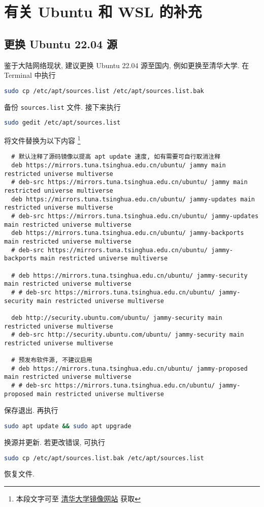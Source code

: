 
\chapter{有关 Ubuntu 和 WSL 的补充}\label{chp:appendix:addition}

\section{更换 Ubuntu 22.04 源}\label{sec:addition:source}

鉴于大陆网络现状,
建议更换 Ubuntu 22.04 源至国内,
例如更换至清华大学.
在 \textsf{Terminal} 中执行
\begin{lstlisting}[language = bash]
  sudo cp /etc/apt/sources.list /etc/apt/sources.list.bak
\end{lstlisting}
备份 \texttt{sources.list} 文件.
接下来执行
\begin{lstlisting}[language = bash]
  sudo gedit /etc/apt/sources.list
\end{lstlisting}
将文件替换为以下内容%
\footnote{本段文字可至%
  \href{https://mirrors.tuna.tsinghua.edu.cn/help/ubuntu/}{清华大学镜像网站}%
  获取}
\begin{lstlisting}
  # 默认注释了源码镜像以提高 apt update 速度, 如有需要可自行取消注释
  deb https://mirrors.tuna.tsinghua.edu.cn/ubuntu/ jammy main restricted universe multiverse
  # deb-src https://mirrors.tuna.tsinghua.edu.cn/ubuntu/ jammy main restricted universe multiverse
  deb https://mirrors.tuna.tsinghua.edu.cn/ubuntu/ jammy-updates main restricted universe multiverse
  # deb-src https://mirrors.tuna.tsinghua.edu.cn/ubuntu/ jammy-updates main restricted universe multiverse
  deb https://mirrors.tuna.tsinghua.edu.cn/ubuntu/ jammy-backports main restricted universe multiverse
  # deb-src https://mirrors.tuna.tsinghua.edu.cn/ubuntu/ jammy-backports main restricted universe multiverse

  # deb https://mirrors.tuna.tsinghua.edu.cn/ubuntu/ jammy-security main restricted universe multiverse
  # # deb-src https://mirrors.tuna.tsinghua.edu.cn/ubuntu/ jammy-security main restricted universe multiverse

  deb http://security.ubuntu.com/ubuntu/ jammy-security main restricted universe multiverse
  # deb-src http://security.ubuntu.com/ubuntu/ jammy-security main restricted universe multiverse

  # 预发布软件源, 不建议启用
  # deb https://mirrors.tuna.tsinghua.edu.cn/ubuntu/ jammy-proposed main restricted universe multiverse
  # # deb-src https://mirrors.tuna.tsinghua.edu.cn/ubuntu/ jammy-proposed main restricted universe multiverse
\end{lstlisting}
保存退出.
再执行
\begin{lstlisting}[language=bash]
  sudo apt update && sudo apt upgrade
\end{lstlisting}
换源并更新.
若更改错误,
可执行
\begin{lstlisting}[language=bash]
  sudo cp /etc/apt/sources.list.bak /etc/apt/sources.list
\end{lstlisting}
恢复文件.

